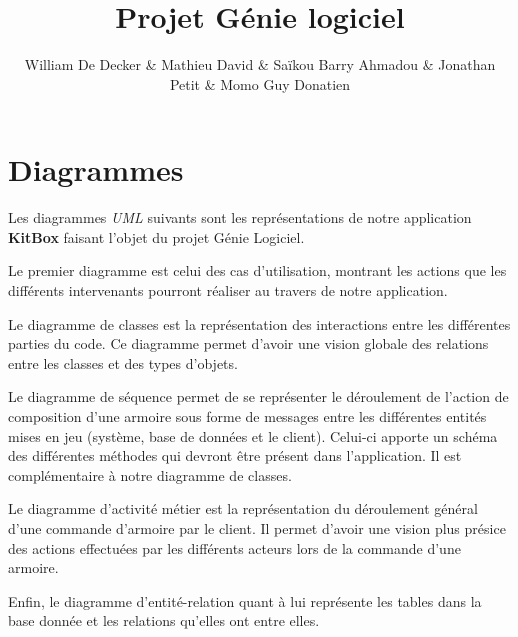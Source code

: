 \documentclass{ecam}
\begin{document}
\title{Projet Génie logiciel \\\vspace{10pt}\fontsize{30pt}{60pt}\selectfont{KitBox}}
\author{William De Decker \& Mathieu David \& Saïkou Barry Ahmadou \linebreak \& Jonathan Petit \& Momo Guy Donatien}
\maketitle

\chapter{Diagrammes}
Les diagrammes \textit{UML} suivants sont les représentations de notre application
\textbf{KitBox} faisant l'objet du projet Génie Logiciel.

Le premier diagramme est celui des cas d'utilisation, montrant
les actions que les différents intervenants pourront réaliser au travers
de notre application.

Le diagramme de classes est la représentation des interactions entre les
différentes parties du code. Ce diagramme permet d'avoir une vision globale
des relations entre les classes et des types d'objets.

Le diagramme de séquence permet de se représenter le déroulement de l'action de
composition d'une armoire sous forme de messages entre les différentes entités
mises en jeu (système, base de données et le client). Celui-ci apporte un schéma
des différentes méthodes qui devront être présent dans l'application. Il est
complémentaire à notre diagramme de classes.

Le diagramme d'activité métier est la représentation du déroulement général d'une
commande d'armoire par le client. Il permet d'avoir une vision plus présice des
actions effectuées par les différents acteurs lors de la commande d'une armoire.

Enfin, le diagramme d'entité-relation quant à lui représente les tables dans la base
donnée et les relations qu'elles ont entre elles.
\end{document}
